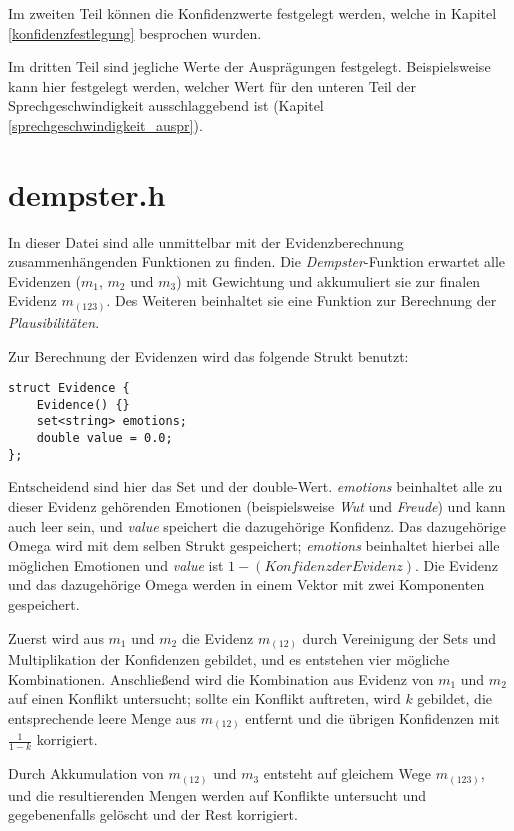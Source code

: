 Im zweiten Teil können die Konfidenzwerte festgelegt werden, welche in Kapitel \ref{konfidenzfestlegung} besprochen wurden.

Im dritten Teil sind jegliche Werte der Ausprägungen festgelegt. Beispielsweise kann hier festgelegt werden, welcher Wert für den unteren Teil der Sprechgeschwindigkeit ausschlaggebend ist (Kapitel \ref{sprechgeschwindigkeit_auspr}).

\section{dempster.h}
In dieser Datei sind alle unmittelbar mit der Evidenzberechnung zusammenhängenden Funktionen zu finden. Die \textit{Dempster}-Funktion erwartet alle Evidenzen (\(m_1\), \(m_2\) und \(m_3\)) mit Gewichtung und akkumuliert sie zur finalen Evidenz \(m_(123)\). Des Weiteren beinhaltet sie eine Funktion zur Berechnung der \textit{Plausibilitäten}.

Zur Berechnung der Evidenzen wird das folgende Strukt benutzt:

\begin{lstlisting}[caption=Strukt zur Evidenzberechnung, label=structcode]
struct Evidence {
	Evidence() {}
	set<string> emotions;
	double value = 0.0;
};
\end{lstlisting}

Entscheidend sind hier das Set und der double-Wert. \textit{emotions} beinhaltet alle zu dieser Evidenz gehörenden Emotionen (beispielsweise \textit{Wut} und \textit{Freude}) und kann auch leer sein, und \textit{value} speichert die dazugehörige Konfidenz. Das dazugehörige Omega wird mit dem selben Strukt gespeichert; \textit{emotions} beinhaltet hierbei alle möglichen Emotionen und \textit{value} ist \(1 - (Konfidenz der Evidenz)\). Die Evidenz und das dazugehörige Omega werden in einem Vektor mit zwei Komponenten gespeichert.

Zuerst wird aus \(m_1\) und \(m_2\) die Evidenz \(m_(12)\) durch Vereinigung der Sets und Multiplikation der Konfidenzen gebildet, und es entstehen vier mögliche Kombinationen. Anschließend wird die Kombination aus Evidenz von \(m_1\) und \(m_2\) auf einen Konflikt untersucht; sollte ein Konflikt auftreten, wird \(k\) gebildet, die entsprechende leere Menge aus \(m_(12)\) entfernt und die übrigen Konfidenzen mit \(\frac{1}{1-k}\) korrigiert.

Durch Akkumulation von \(m_(12)\) und \(m_3\) entsteht auf gleichem Wege \(m_(123)\), und die resultierenden Mengen werden auf Konflikte untersucht und gegebenenfalls gelöscht und der Rest korrigiert.
 
